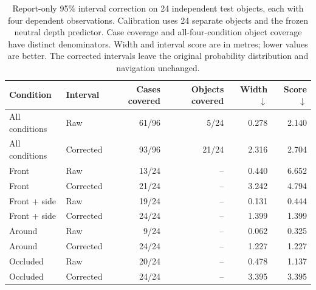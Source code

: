 \begin{table}[tbp]
\centering\small
\caption{Report-only 95\% interval correction on 24 independent test objects, each with four dependent observations. Calibration uses 24 separate objects and the frozen neutral depth predictor. Case coverage and all-four-condition object coverage have distinct denominators. Width and interval score are in metres; lower values are better. The corrected intervals leave the original probability distribution and navigation unchanged.}
\label{tab:b9-intervals}
\begin{tabular}{llrrrr}
\toprule
Condition & Interval & Cases covered & Objects covered & Width $\downarrow$ & Score $\downarrow$ \\
\midrule
All conditions & Raw & 61/96 & 5/24 & 0.278 & 2.140 \\
All conditions & Corrected & 93/96 & 21/24 & 2.316 & 2.704 \\
\midrule
Front & Raw & 13/24 & -- & 0.440 & 6.652 \\
Front & Corrected & 21/24 & -- & 3.242 & 4.794 \\
Front + side & Raw & 19/24 & -- & 0.131 & 0.444 \\
Front + side & Corrected & 24/24 & -- & 1.399 & 1.399 \\
Around & Raw & 9/24 & -- & 0.062 & 0.325 \\
Around & Corrected & 24/24 & -- & 1.227 & 1.227 \\
Occluded & Raw & 20/24 & -- & 0.478 & 1.137 \\
Occluded & Corrected & 24/24 & -- & 3.395 & 3.395 \\
\bottomrule
\end{tabular}
\end{table}
